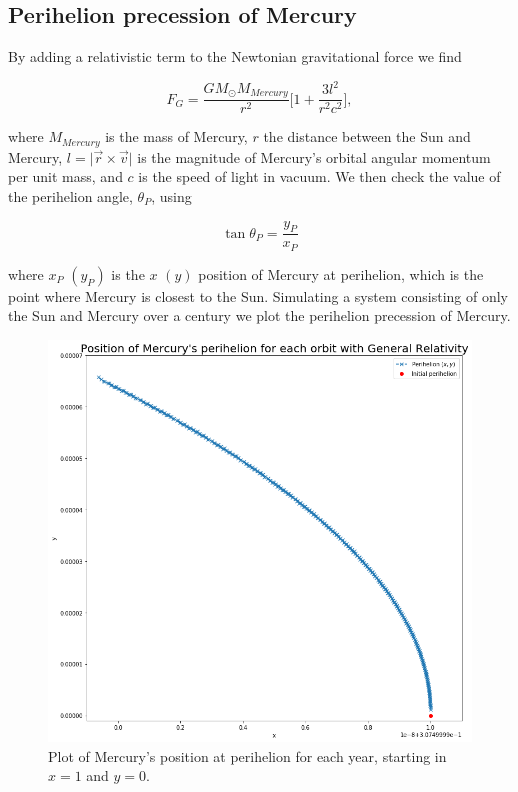 \documentclass[a4paper, fontsize=11pt]{article}
\begin{document}
\subsection{Perihelion precession of Mercury}

By adding a relativistic term to the Newtonian gravitational force we find

\begin{equation}
F_{G} = \dfrac{G M_{\odot} M_{Mercury}}{r^2}\Big[1 + \dfrac{3l^2}{r^2c^2} \Big],
\end{equation}

where $M_{Mercury}$ is the mass of Mercury, $r$ the distance between the Sun and Mercury, $l = \lvert \vec{r} \times \vec{v} \rvert$ is the magnitude of Mercury's orbital angular momentum per unit mass, and $c$ is the speed of light in vacuum. We then check the value of the perihelion angle, $\theta_{P}$, using

\begin{equation}
\tan \theta_{P} = \dfrac{y_{P}}{x_{P}}
\end{equation}

where $x_{P}$ $(y_{P})$ is the $x$ $(y)$ position of Mercury at perihelion, which is the point where Mercury is closest to the Sun. Simulating a system consisting of only the Sun and Mercury over a century we plot the perihelion precession of Mercury.

\begin{figure}[H]
\centering
\includegraphics[scale=0.45]{plots/GeneralRelativityMercury}
\caption{Plot of Mercury's position at perihelion for each year, starting in $x=1$ and $y=0$.}
\label{GRMercury}
\end{figure}
\end{document}
